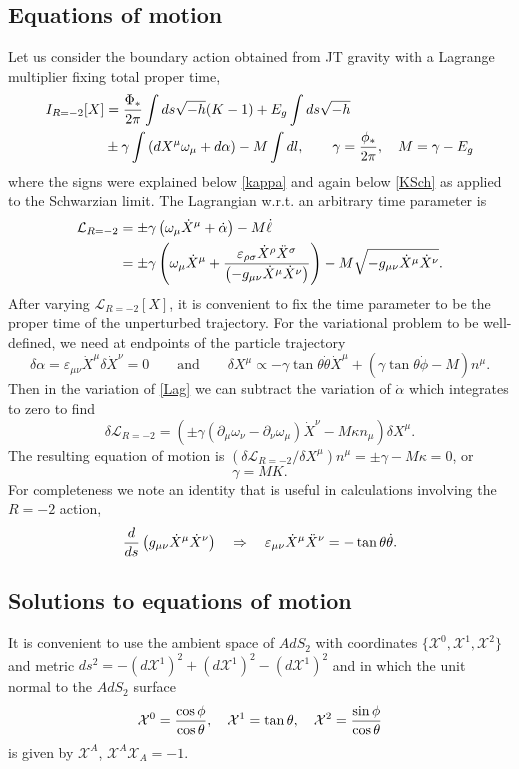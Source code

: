 \documentclass[12pt]{article}
\newcommand{\be}{\begin{equation}}
\newcommand{\ee}{\end{equation}}
\newcommand{\nn}{\nonumber\\}
\newcommand{\vep}{\varepsilon}
\newcommand{\calL}{\mathcal{L}}
\newcommand{\calX}{\mathcal{X}}
\DeclareMathOperator{\AdS}{AdS}
\newcommand{\al}{\alpha}
\newcommand{\sig}{\sigma}
\newcommand{\tht}{\theta}
\newcommand{\ka}{\kappa}
\newcommand{\om}{\omega}
\newcommand{\ga}{\gamma}
\newcommand{\de}{\delta}
\newcommand{\ov}{\over}
\newcommand{\p}{\partial}
\def\AdS{AdS}
\begin{document}
\subsection{Equations of motion}
Let us consider the boundary action obtained from JT gravity with a Lagrange multiplier fixing total proper time,
\begin{align}
I_{R=-2}[X]&={\Phi_* \ov 2 \pi}\int ds \sqrt{-h}(K-1) + E_g \int ds \sqrt{-h}\nn
&\pm \ga \int \left(dX^{\mu}\om_{\mu}+d \al\right)- M \int dl, \qquad \ga={\phi_* \ov 2 \pi}, \quad M=\ga-E_g
\end{align}
where the signs were explained below \eqref{kappa} and again below \eqref{KSch} as applied to the Schwarzian limit.
The Lagrangian w.r.t. an arbitrary time parameter is 
\begin{align}
\calL_{R=-2}&=\pm \ga \left( \om_{\mu}\dot{X}^{\mu}+\dot{\al}\right)-M \dot{\ell}\nn
&=\pm \ga\left(\om_{\mu}\dot{X}^{\mu}+{\vep_{\rho\sig}\dot{X}^{\rho}\ddot{X}^{\sig} \ov \left(-g_{\mu\nu}\dot{X}^{\mu}\dot{X}^{\nu}\right)}\right)-M \sqrt{-g_{\mu\nu}\dot{X}^{\mu}\dot{X}^{\nu}}.
\end{align}
After varying $\calL_{R=-2}[X]$, it is convenient to fix the time parameter to be the proper time of the unperturbed trajectory. For the variational problem to be well-defined, we need at endpoints of the particle trajectory
\be \label{Lag}
\de \al =\vep_{\mu\nu}\dot{X}^{\mu}\de \dot{X}^{\nu}=0 \qquad \text{and} \qquad \de X^{\mu} \propto -\ga \tan \tht \dot{\tht}\dot{X}^{\mu}+\left(\ga \tan \tht \dot{\phi} - M\right)n^{\mu}.
\ee
Then in the variation of \eqref{Lag} we can subtract the variation of $\dot{\al}$ which integrates to zero to find 
\be
\de \calL_{R=-2}=\left( \pm \ga \left( \p_{\mu}\om_{\nu}-\p_{\nu}\om_{\mu}\right)\dot{X}^{\nu}-M \ka n_{\mu}\right)\de X^{\mu}.
\ee
The resulting equation of motion is $\left(\de \calL_{R=-2}/ \de X^{\mu}\right)n^{\mu}=\pm \ga-M \ka=0$, or
\be \label{eom}
\ga=M K.
\ee
For completeness we note an identity that is useful in calculations involving the $R=-2$ action,
\be
{d \ov ds}\left(g_{\mu\nu}\dot{X}^{\mu}\dot{X}^{\nu}\right) \quad \Rightarrow \quad \vep_{\mu\nu}\dot{X}^{\mu}\ddot{X}^{\nu}=-\tan \tht \dot{\tht}.
\ee

\subsection{Solutions to equations of motion}
It is convenient to use the ambient space of $\AdS_2$ with coordinates $\{\calX^{0} , \calX^1, \calX^{2}\}$ and metric $ds^2=-\left(d\calX^1\right)^2+\left(d\calX^1\right)^2-\left(d\calX^1\right)^2$ and in which the unit normal to the $\AdS_2$ surface
\be
\calX^{0}={\cos \phi \ov \cos\tht}, \quad \calX^{1}=\tan \tht, \quad \calX^{2}={\sin \phi \ov \cos \tht}
\ee
 is given by $\calX^{A}$, $\calX^{A}\calX_{A}=-1$. 
\end{document}

